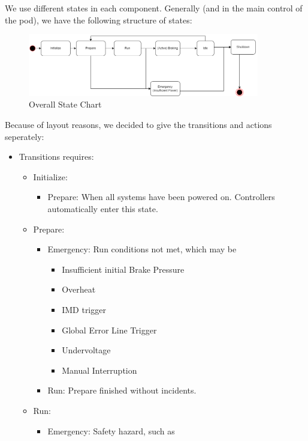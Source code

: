 We use different states in each component.
Generally (and in the main control of the pod), we have the following structure of states:
\begin{figure}[H]
    \centering
   \includegraphics[width=0.9\textwidth]{texfiles/elec/eimg/Statechart}
    \caption{Overall State Chart}
    \label{fig:overall-state-chart}
\end{figure}
Because of layout reasons, we decided to give the transitions and actions seperately:
\begin{itemize}
    \item Transitions requires:
    \begin{itemize}
        \item Initialize:
        \begin{itemize}
            \item Prepare: When all systems have been powered on. Controllers automatically enter this state.
        \end{itemize}
        \item Prepare:
        \begin{itemize}
            \item Emergency: Run conditions not met, which may be
            \begin{itemize}
                \item Insufficient initial Brake Pressure
                \item Overheat
                \item IMD trigger
                \item Global Error Line Trigger
                \item Undervoltage
                \item Manual Interruption
            \end{itemize}
            \item Run: Prepare finished without incidents.
        \end{itemize}
        \item Run:
        \begin{itemize}
            \item Emergency: Safety hazard, such as

\end{itemize}
\end{itemize}
\end{itemize}
